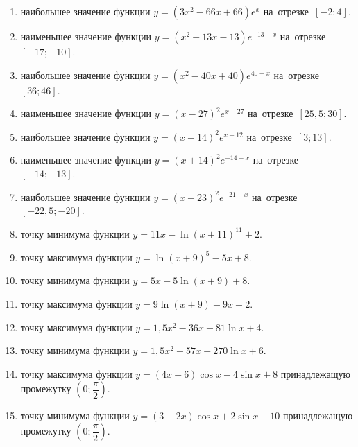 \documentclass[a4paper,10pt]{article}
\begin{document}
\begin{enumerate}
\item {} наибольшее значение функции $y=\left(3x^2 -66x +66\right)e^{x}$ на~отрезке~$\left[-2;4\right]$.

\item {} наименьшее значение функции $y=\left(x^2 +13x -13\right)e^{-13-x}$ на~отрезке~$\left[-17;-10\right]$.

\item {} наибольшее значение функции $y=\left(x^2 -40x +40\right)e^{40-x}$ на~отрезке~$\left[36;46\right]$.

\item {} наименьшее значение функции $y=\left(x-27\right)^2e^{x-27}$ на~отрезке~$\left[25,5;30\right]$.

\item {} наибольшее значение функции $y=\left(x-14\right)^2e^{x-12}$ на~отрезке~$\left[3;13\right]$.

\item {} наименьшее значение функции $y=\left(x+14\right)^2e^{-14-x}$ на~отрезке~$\left[-14;-13\right]$.

\item {} наибольшее значение функции $y=\left(x+23\right)^2e^{-21-x}$ на~отрезке~$\left[-22,5;-20\right]$.

\item {} точку минимума функции $y=11x-\ln\left(x+11\right)^{11}+2$.

\item {} точку максимума функции $y=\ln\left(x+9\right)^{5}-5x+8$.

\item {} точку минимума функции $y=5x-5\ln\left(x+9\right)+8$.

\item {} точку максимума функции $y=9\ln\left(x+9\right)-9x+2$.

\item {} точку максимума функции $y=1,5x^2-36x+81\ln x +4$.

\item {} точку минимума функции $y=1,5x^2-57x+270\ln x +6$.

\item {} точку максимума функции $y=\left(4x-6\right)\cos x -4\sin x+8$
принадлежащую промежутку $\left(0;\dfrac{\pi}{2}\right)$.

\item {} точку минимума функции $y=\left(3-2x\right)\cos x +2\sin x+10$
принадлежащую промежутку $\left(0;\dfrac{\pi}{2}\right)$.


\end{enumerate}
\end{document}
